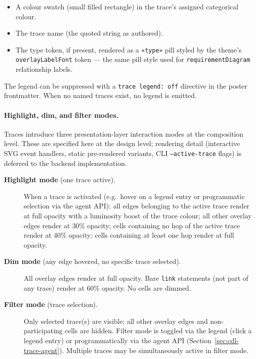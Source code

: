 \begin{itemize}
  \item A colour swatch (small filled rectangle) in the trace's assigned
    categorical colour.
  \item The trace name (the quoted string as authored).
  \item The type token, if present, rendered as a \texttt{«type»} pill styled
    by the theme's \texttt{overlayLabelFont} token --- the same pill style
    used for \texttt{requirementDiagram} relationship labels.
\end{itemize}

The legend can be suppressed with a \texttt{trace legend: off} directive in
the poster frontmatter.  When no named traces exist, no legend is emitted.

\paragraph{Highlight, dim, and filter modes.}

Traces introduce three presentation-layer interaction modes at the composition
level.  These are specified here at the design level; rendering detail
(interactive SVG event handlers, static pre-rendered variants, CLI
\texttt{--active-trace} flags) is deferred to the backend implementation.

\begin{description}
  \item[\textbf{Highlight mode} (one trace active).]  When a trace is
    activated (e.g.\ hover on a legend entry or programmatic selection via the
    agent API): all edges belonging to the active trace render at full opacity
    with a luminosity boost of the trace colour; all other overlay edges render
    at 30\% opacity; cells containing no hop of the active trace render at 40\%
    opacity; cells containing at least one hop render at full opacity.

  \item[\textbf{Dim mode} (any edge hovered, no specific trace selected).]
    All overlay edges render at full opacity.  Bare \texttt{link} statements
    (not part of any trace) render at 60\% opacity.  No cells are dimmed.

  \item[\textbf{Filter mode} (trace selection).]  Only selected trace(s) are
    visible; all other overlay edges and non-participating cells are hidden.
    Filter mode is toggled via the legend (click a legend entry) or
    programmatically via the agent API
    (Section~\ref{sec:cdl-trace-agent}).  Multiple traces may be simultaneously
    active in filter mode.
\end{description}

